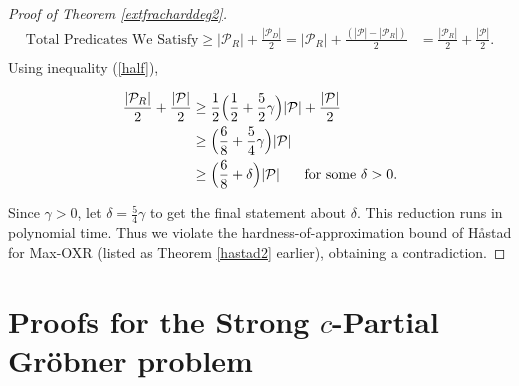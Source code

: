 \documentclass{article}
\begin{document}
\begin{proof}[Proof of Theorem \ref{extfracharddeg2}]
\begin{align*}
\text{Total Predicates We Satisfy}\geq|\mathcal{P}_R|+\frac{|\mathcal{P}_D|}{2} = 
|\mathcal{P}_R|+\frac{(|\mathcal{P}|-|\mathcal{P}_R|)}{2}&= 
\frac{|\mathcal{P}_R|}{2}+\frac{|\mathcal{P}|}{2}.\\
\end{align*}
Using inequality (\ref{half}),



\begin{align*}
\frac{|\mathcal{P}_R|}{2}+\frac{|\mathcal{P}|}{2}&\geq 
\frac{1}{2}\Big(\frac{1}{2}+\frac{5}{2}\gamma\Big)|\mathcal{P}|+\frac{|\mathcal{P}|}{2}\\
&\geq 
\Big(\frac{6}{8}+\frac{5}{4}\gamma\Big)|\mathcal{P}|\\
&\geq 
\Big(\frac{6}{8}+\delta\Big)|\mathcal{P}| \hspace{5mm} \text{ for some  $\delta>0$.}
\end{align*}



\noindent 
Since $\gamma>0$, let $\delta=\frac{5}{4}\gamma$ to get the final statement about $\delta$. This reduction runs in polynomial time. Thus we violate the hardness-of-approximation bound of H{\aa}stad for Max\nobreakdash-OXR (listed as Theorem \ref{hastad2} earlier), obtaining a contradiction.
\end{proof}






\section{Proofs for the Strong $c$\nobreakdash-Partial Gr\"{o}bner problem}
\label{sec:partial}
\end{document}
